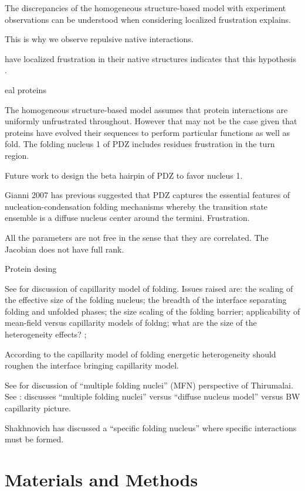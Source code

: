 \documentclass[preprint]{elsarticle}
\begin{document}
    The discrepancies of the homogeneous structure-based model with experiment
observations can be understood when considering localized frustration explains.

This is why we observe repulsive native interactions.

 have localized frustration in their native 
structures indicates that this hypothesis .  

eal proteins 

The homogeneous structure-based model assumes that protein interactions are
uniformly unfrustrated throughout. However that may not be the case given that
proteins have evolved their sequences to perform particular functions as well
as fold. The folding nucleus 1 of PDZ includes residues frustration in the turn
region.

    Future work to design the beta hairpin of PDZ to favor nucleus 1.

    Gianni 2007 has previous suggested that PDZ captures the essential features
of nucleation-condensation folding mechanisms whereby the transition state
ensemble is a diffuse nucleus center around the termini. Frustration.

    All the parameters are not free in the sense that they are correlated. The
Jacobian does not have full rank.

    Protein desing 

    See \cite{Wolynes1997} for discussion of capillarity model of folding. Issues
raised are: the scaling of the effective size of the folding nucleus; the
breadth of the interface separating folding and unfolded phases; the size
scaling of the folding barrier; applicability of mean-field versus capillarity
models of foldng; what are the size of the heterogeneity effects? ; 

    According to the capillarity model of folding \cite{Wolynes1997} energetic 
heterogeneity should roughen the interface bringing capillarity model.


    See \cite{Klimov1998b} for discussion of ``multiple folding nuclei'' (MFN) 
perspective of Thirumalai. See \cite{Chen2008}: discusses ``multiple folding
nuclei'' versus ``diffuse nucleus model'' versus BW capillarity picture.

    Shakhnovich has discussed a ``specific folding nucleus'' \cite{Shakhnovich1998}
where specific interactions must be formed.


\section{Materials and Methods}
\end{document}
